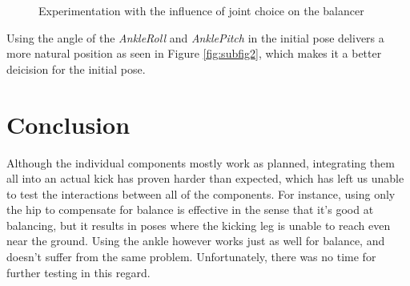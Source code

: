 \documentclass[a4paper]{article}
\begin{document}
\begin{figure}[ht]
\centering



\label{myfigure}
\caption{Experimentation with the influence of joint choice on the balancer}
\end{figure}
Using the angle of the \emph{AnkleRoll} and \emph{AnklePitch} in the initial
pose delivers a more natural position as seen in Figure \ref{fig:subfig2},
which makes it a better deicision for the initial pose. 

\section{Conclusion}
Although the individual components mostly work as planned, integrating
them all into an actual kick has proven harder than expected, which
has left us unable to test the interactions between all of the
components. For instance, using only the hip to compensate for balance
is effective in the sense that it's good at balancing, but it results
in poses where the kicking leg is unable to reach even near the
ground. Using the ankle however works just as well for balance, and
doesn't suffer from the same problem. Unfortunately, there was no time
for further testing in this regard.
\end{document}
